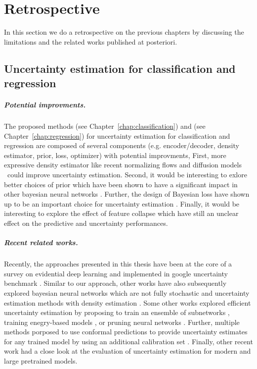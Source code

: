 \chapter{Retrospective}
\label{chap:retrospective}

In this section we do a retrospective on the previous chapters by discussing the limitations and the related works published at posteriori.

\section{Uncertainty estimation for classification and regression} 

\paragraph{Potential improvments.} The proposed methods \PostNetacro{} (see Chapter~\ref{chap:classification}) and \NatPNacro{} (see Chapter~\ref{chap:regression}) for uncertainty estimation for classification and regression are composed of several components (e.g. encoder/decoder, density estimator, prior, loss, optimizer) with potential improvments, First, more expressive density estimator like recent normalizing flows \cite{nf-review} and diffusion models \cite{variationaldiffussion2022kingma} could improve uncertainty estimation. Second, it would be interesting to exlore better choices of prior which have been shown to have a significant impact in other bayesian neural networks \cite{bayesposterior2020wenzel, coldaleatoric2020adlam}. Further, the design of Bayesian loss have shown up to be an important choice for uncertainty estimation \cite{bengs2022pitfalls}. Finally, it would be interesting to explore the effect of feature collapse \cite{due} which have still an unclear effect on the predictive and uncertainty performances.

\paragraph{Recent related works.} Recently, the approaches presented in this thesis have been  at the core of a survey on evidential deep learning \cite{survey_evidential_uncertainty} and implemented in google uncertainty benchmark \cite{nado2021uncertainty}. Similar to our approach, other works have also subsequently explored bayesian neural networks which are not fully stochastic \cite{bnnfullystochastic2022sharma} and uncertainty estimation methods with density estimation \cite{du2022vos, postels2020hiddenuncertainty, sensoy2020uncertainty}. Some other works explored efficient uncertainty estimation by proposing to train an ensemble of subnetworks \cite{mimo-independent-subnetworks}, training enegry-based models \cite{ood_ebm}, or pruning neural networks \cite{ayle2022robustness-sparse}. Further, multiple methods porposed to use conformal predictions to provide uncertainty estimates for any trained model by using an additional calibration set \cite{conformal-survey, Park2020PAC}. Finally, other recent work \cite{minderer2021revisiting, tran2022plex} had a close look at the evaluation of uncertainty estimation for modern and large pretrained models.

